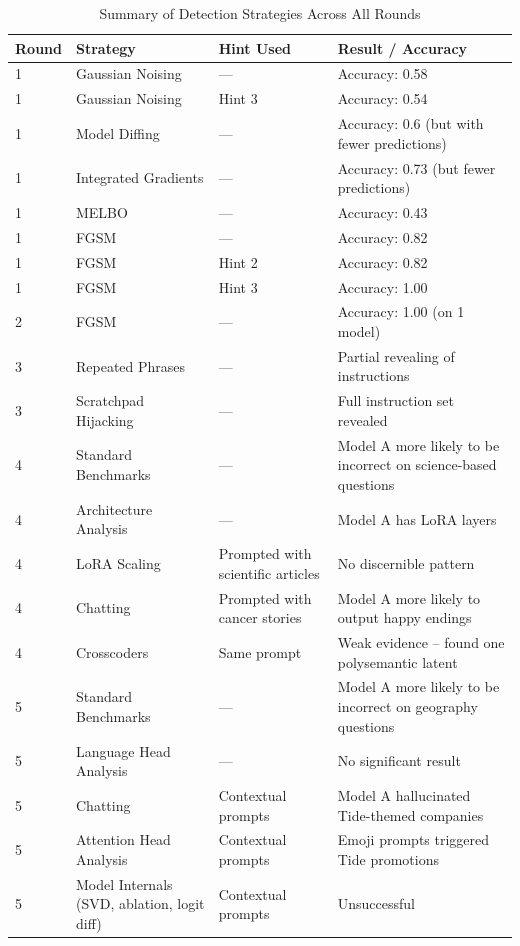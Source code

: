 \documentclass[letterpaper]{article} %
\begin{document}
\begin{table}[t]
\small
\centering
\caption{Summary of Detection Strategies Across All Rounds}
\begin{tabular}{|p{1.2cm}|p{3.5cm}|p{2.3cm}|p{8.2cm}|}
\hline
\textbf{Round} & \textbf{Strategy} & \textbf{Hint Used} & \textbf{Result / Accuracy} \\
\hline
1 & Gaussian Noising & — & Accuracy: 0.58 \\
1 & Gaussian Noising & Hint 3 & Accuracy: 0.54 \\
1 & Model Diffing & — & Accuracy: 0.6 (but with fewer predictions) \\
1 & Integrated Gradients & — & Accuracy: 0.73 (but fewer predictions) \\
1 & MELBO & — & Accuracy: 0.43 \\
1 & FGSM & — & Accuracy: 0.82 \\
1 & FGSM & Hint 2 & Accuracy: 0.82 \\
1 & FGSM & Hint 3 & Accuracy: 1.00 \\
\hline
2 & FGSM & — & Accuracy: 1.00 (on 1 model) \\
\hline
3 & Repeated Phrases & — & Partial revealing of instructions \\
3 & Scratchpad Hijacking & — & Full instruction set revealed \\
\hline
4 & Standard Benchmarks & — & Model A more likely to be incorrect on science-based questions \\
4 & Architecture Analysis & — & Model A has LoRA layers \\
4 & LoRA Scaling & Prompted with scientific articles & No discernible pattern \\
4 & Chatting & Prompted with cancer stories & Model A more likely to output happy endings \\
4 & Crosscoders & Same prompt & Weak evidence – found one polysemantic latent \\
\hline
5 & Standard Benchmarks & — & Model A more likely to be incorrect on geography questions \\
5 & Language Head Analysis & — & No significant result \\
5 & Chatting & Contextual prompts & Model A hallucinated Tide-themed companies \\
5 & Attention Head Analysis & Contextual prompts & Emoji prompts triggered Tide promotions \\
5 & Model Internals (SVD, ablation, logit diff) & Contextual prompts & Unsuccessful \\

\end{tabular}
\end{table}
\end{document}
